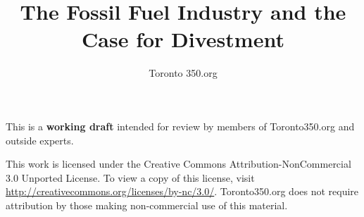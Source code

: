 \documentclass[10pt]{article}
\author{Toronto 350.org}
\title{The Fossil Fuel Industry and the Case for Divestment}
\begin{document}
\marginsize{1in}{1in}{1in}{1in}
\maketitle

\vspace{5cm}

{\small This is a \textbf{working draft} intended for review by members of Toronto350.org and outside experts.}

\vspace{5cm}

{\small This work is licensed under the Creative Commons Attribution-NonCommercial 3.0 Unported License. To view a copy of this license, visit \url{http://creativecommons.org/licenses/by-nc/3.0/}.
Toronto350.org does not require attribution by those making non-commercial use of this material.}


\clearpage

\tableofcontents






























\end{document}
